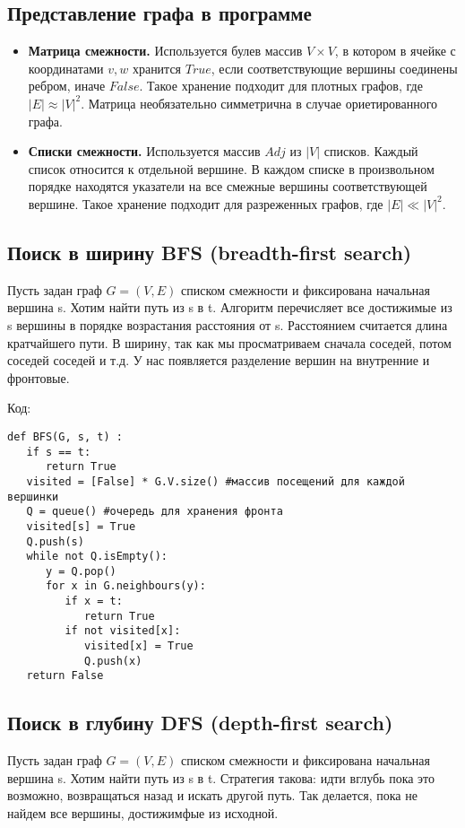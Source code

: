 \subsection* {Представление графа в программе}
\begin{itemize}
\item  {\bf Матрица смежности.} Используется булев массив $V \times V$, в котором в ячейке с координатами $v, w$ хранится $True$, если соответствующие вершины соединены ребром, иначе $False$. Такое хранение подходит для плотных графов, где $|E| \approx |V|^2$. Матрица необязательно симметрична в случае ориетированного графа.
\item  {\bf Списки смежности.} Используется массив $Adj$ из $|V|$ списков. Каждый список относится к отдельной вершине. В каждом списке в произвольном порядке находятся указатели на все смежные вершины соответствующей вершине. Такое хранение подходит для разреженных графов, где $|E| \ll |V|^2$.
\end{itemize}

\subsection* {Поиск в ширину BFS (breadth-first search)}
Пусть задан граф $G = (V,E)$ списком смежности и фиксирована начальная вершина s. Хотим найти путь из s в t. Алгоритм перечисляет все достижимые из s вершины в порядке возрастания расстояния от s. Расстоянием считается длина кратчайшего пути. В ширину, так как мы просматриваем сначала соседей, потом соседей соседей и т.д. У нас появляется разделение вершин на внутренние и фронтовые.

Код:
\begin{verbatim}
def BFS(G, s, t) :
   if s == t:
      return True
   visited = [False] * G.V.size() #массив посещений для каждой вершинки
   Q = queue() #очередь для хранения фронта
   visited[s] = True
   Q.push(s)
   while not Q.isEmpty():
      y = Q.pop()
      for x in G.neighbours(y):
         if x = t:
            return True
         if not visited[x]:
            visited[x] = True
            Q.push(x)
   return False
\end{verbatim}

\subsection* {Поиск в глубину DFS (depth-first search)}

Пусть задан граф $G = (V,E)$ списком смежности и фиксирована начальная вершина s. Хотим найти путь из s в t. Стратегия такова: идти вглубь пока это возможно, возвращаться назад и искать другой путь. Так делается, пока не найдем все вершины, достижимфые из исходной.

